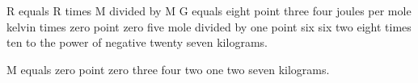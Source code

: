R equals R times M divided by M G equals eight point three four joules per mole kelvin times zero point zero five mole divided by one point six six two eight times ten to the power of negative twenty seven kilograms.

M equals zero point zero three four two one two seven kilograms.